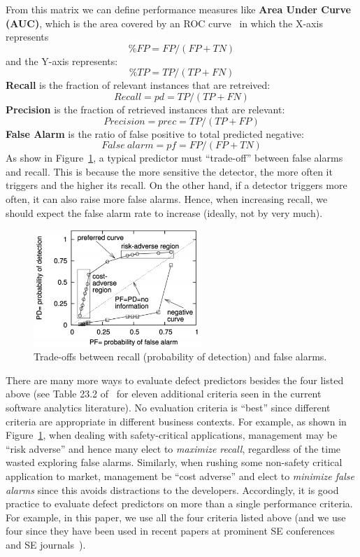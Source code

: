 \documentclass[10pt,conference]{IEEEtran}
\theoremstyle{break}
\theoremstyle{break}
\begin{document}
From this matrix  we can define performance measures like   \textbf{Area Under Curve (AUC)}, which 
is the area covered by an ROC curve~\cite{swets1988measuring, duda2012pattern} in which the X-axis represents
\[\%\mathit{FP} = \mathit{FP}/(\mathit{FP} + \mathit{TN})\]
and the Y-axis represents:
\[\%\mathit{TP} = \mathit{TP}/(\mathit{TP} + \mathit{FN})\]
\textbf{Recall}  is the fraction of  relevant instances that are retreived:
\[Recall= pd  = \mathit{TP}/(\mathit{TP} + \mathit{FN})\]
 \textbf{Precision} is the fraction of retrieved instances that are relevant:
\[Precision  = prec = \mathit{TP}/(\mathit{TP} + \mathit{FP})\]
\textbf{False Alarm} is the ratio of false positive to total predicted negative:
\[False\ alarm = pf  = \mathit{FP}/(\mathit{FP} + \mathit{TN})\]
As show in Figure~\ref{fig:trade},
a typical predictor must ``trade-off''
between false alarms and recall.
This is because the  more sensitive the detector, the more often it triggers and the higher its recall. On the other hand,  if a detector triggers more often, it can also raise more false alarms.
Hence, when increasing recall, we  should  expect
the false alarm rate to  increase
(ideally, not by very much).


\begin{figure}[!b]
\begin{center}
\includegraphics[width=2.5in]{roc.png}
\end{center}
\caption{Trade-offs between
recall (probability of detection) and false alarms.}\label{fig:trade}
\end{figure}

There are many more ways to evaluate defect predictors besides the four listed above
(see Table 23.2 of~\cite{menzies2014sharing} for   eleven additional
criteria seen in the current software analytics literature).
No evaluation criteria is ``best'' since different  criteria are appropriate in different business contexts. For example, as shown
in 
Figure~\ref{fig:trade},
when dealing
with safety-critical applications, management may be
``risk adverse'' and hence many elect
 to {\em maximize recall}, regardless of the time wasted exploring  false alarms.
 Similarly, 
when rushing some non-safety critical application to market, management  be ``cost adverse''
and elect to {\em minimize false alarms} since this avoids distractions to the developers. 
 Accordingly, it is good practice to evaluate defect predictors on more than a single performance criteria. For example, in this paper,
we use all the four   criteria listed above
(and we use four since they have
been used in recent papers  
at prominent SE conferences~\cite{ghotra2015revisiting} and SE journals~\cite{fu2016tuning}).
 
\end{document}
